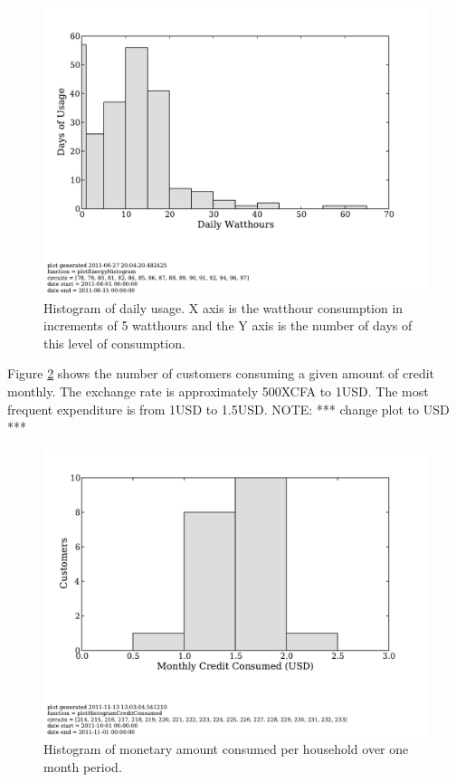 \documentclass[conference]{IEEEtran}
\newcommand{\note}[1]{{\color{red} NOTE: *** #1 ***}}
\begin{document}
\begin{figure}[]
\begin{center}
\includegraphics[trim = 0in 1.3in 0in 0in, clip, width=\columnwidth]
                {figures/ml06Histogram.pdf}
\end{center}
\caption{Histogram of daily usage.  X axis is the watthour consumption
in increments of 5 watthours and the Y axis is the number of days of
this level of consumption.}
\label{ml06Histogram}
\end{figure}

Figure \ref{consumptionHistogram} shows the number of customers consuming 
a given amount of credit monthly.  The exchange rate is approximately 500XCFA to 1USD.
The most frequent expenditure is from 1USD to 1.5USD.  
\note{change plot to USD}

\begin{figure}[]
\begin{center}
\includegraphics[trim = 0in 1.3in 0in 0in, clip, width=\columnwidth]
                {figures/consumptionHistogram.pdf}
\end{center}
\caption{Histogram of monetary amount consumed per household over one month period.}
\label{consumptionHistogram}
\end{figure}
\end{document}
